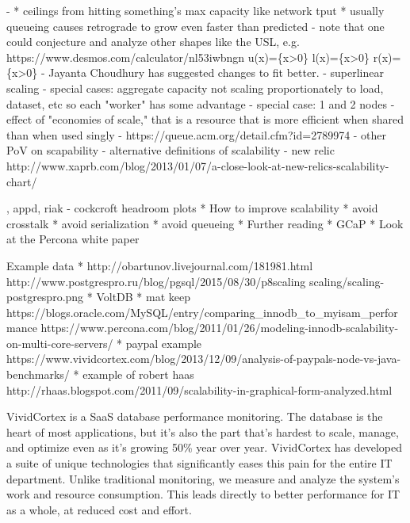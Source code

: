 \documentclass{vivid_layout_pdf}
\begin{document}
  - 
      * ceilings from hitting something’s max capacity like network tput
		    * usually queueing causes retrograde to grow even faster than
			 predicted
	- note that one could conjecture and analyze other shapes like the USL, e.g.
	https://www.desmos.com/calculator/nl53iwbngn
	u\left(x\right)=\left\{x>0\right\}
	l\left(x\right)=\left\{x>0\right\}
	r\left(x\right)=\left\{x>0\right\}
	- Jayanta Choudhury has suggested changes to fit better.
- superlinear scaling
	- special cases: aggregate capacity not scaling proportionately to load,
	dataset, etc so each "worker" has some advantage
	- special case: 1 and 2 nodes
	- effect of "economies of scale," that is a resource that is more efficient
	when shared than when used singly
	- https://queue.acm.org/detail.cfm?id=2789974
- other PoV on scapability
	- alternative definitions of scalability - new relic
	 http://www.xaprb.com/blog/2013/01/07/a-close-look-at-new-relics-scalability-chart/

	, appd, riak
	- cockcroft headroom plots
* How to improve scalability
    * avoid crosstalk
	     * avoid serialization
		      * avoid queueing
* Further reading
				    * GCaP
					     * Look at the Percona white paper


Example data
* http://obartunov.livejournal.com/181981.html
  http://www.postgrespro.ru/blog/pgsql/2015/08/30/p8scaling
  scaling/scaling-postgrespro.png
* VoltDB
* mat keep
https://blogs.oracle.com/MySQL/entry/comparing_innodb_to_myisam_performance
https://www.percona.com/blog/2011/01/26/modeling-innodb-scalability-on-multi-core-servers/
* paypal example
https://www.vividcortex.com/blog/2013/12/09/analysis-of-paypals-node-vs-java-benchmarks/
* example of robert haas
http://rhaas.blogspot.com/2011/09/scalability-in-graphical-form-analyzed.html


\newpage

\begin{about}	%
VividCortex is a SaaS database performance monitoring. The database is the heart of most applications, but it's also the part that's hardest to scale, manage, and optimize even as it's growing 50\% year over year. VividCortex has developed a suite of unique technologies that significantly eases this pain for the entire IT department. Unlike traditional monitoring, we measure
and analyze the system's work and resource consumption. This leads directly to better performance for IT as a whole, at reduced cost and effort.
\end{about}
\makeresources	%
\end{document}
